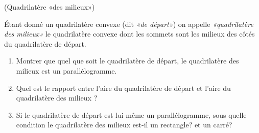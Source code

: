 \documentclass[a4paper,12pt,reqno]{amsart}
\begin{document}
\begin{exo} (Quadrilatère «des milieux»)

  Étant donné un quadrilatère convexe (dit \emph{«de départ»}) on appelle \emph{«quadrilatère des milieux»} le quadrilatère convexe dont les sommets sont les milieux des côtés du quadrilatère de départ.
  \begin{enumerate}
    \item Montrer que quel que soit le quadrilatère de départ, le quadrilatère des milieux est un parallélogramme.
    \item Quel est le rapport entre l'aire du quadrilatère de départ et l'aire du quadrilatère des milieux ?
    \item Si le quadrilatère de départ est lui-même un parallélogramme, sous quelle condition le quadrilatère des milieux est-il un rectangle? et un carré?
  \end{enumerate}
\end{exo}
\end{document}
